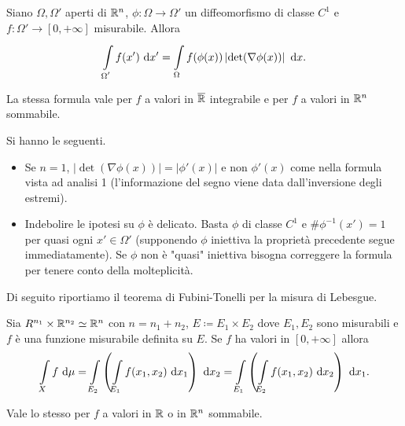 \documentclass[a4paper, 12pt]{report}
\begin{document}
\begin{teorema}
Siano $\Omega, \Omega'$ aperti di $\mathbb R^n$, $\phi \colon \Omega \to \Omega' $ un diffeomorfismo di classe $C^1$ e $f \colon \Omega' \to [0,+\infty]$ misurabile. Allora
\[
\int\limits_{\mathclap{\Omega'}}^{} f(x') \, \dd x' = \int\limits_{\mathclap{\Omega}}^{} f(\phi(x)) \left| \det(\nabla \phi(x)) \right| \, \dd x.
\] 
\end{teorema}

La stessa formula vale per $f$ a valori in $\overline{\mathbb R}$ integrabile e per $f$ a valori in $\mathbb R^n$ sommabile.
\begin{osservazione}
Si hanno le seguenti.
\begin{itemize}
	\item Se $n = 1$, $\left| \det(\nabla \phi(x)) \right| = \left| \phi'(x) \right|$ e non $\phi'(x)$ come nella formula vista ad analisi 1 (l'informazione del segno viene data dall'inversione degli estremi).
	\item Indebolire le ipotesi su $\phi$ è delicato. Basta $\phi$ di classe $C^1$ e $\# \phi^{-1}(x') = 1$ per quasi ogni $x' \in \Omega'$ (supponendo $\phi$ iniettiva la proprietà precedente segue immediatamente).
	Se $\phi$ non è "quasi" iniettiva bisogna correggere la formula per tenere conto della molteplicità.
\end{itemize}
\end{osservazione}

Di seguito riportiamo il teorema di Fubini-Tonelli per la misura di Lebesgue.

\begin{teorema}
Sia $R^{n_1} \times \mathbb R^{n_2} \simeq \mathbb R^n$ con $n = n_1 + n_2$, $ E \coloneqq E_1 \times E_2 $ dove $E_1, E_2$ sono misurabili e $f$ è una funzione misurabile definita su $E$.
Se $f$ ha valori in $[0,+\infty]$ allora
\[
	\int\limits_X f \, \dd \mu = \int\limits_{\mathclap{E_2}}^{} \left( \int\limits_{\mathclap{E_1}}^{} f(x_1,x_2) \, \dd x_1  \right) \, \dd x_2 = \int\limits_{\mathclap{E_1}}^{} \left( \int\limits_{\mathclap{E_2}}^{} f(x_1,x_2) \, \dd x_2  \right) \, \dd x_1.
\] 
\end{teorema}

Vale lo stesso per $f$ a valori in $\mathbb R$ o in $\mathbb R^n$ sommabile.
\end{document}
